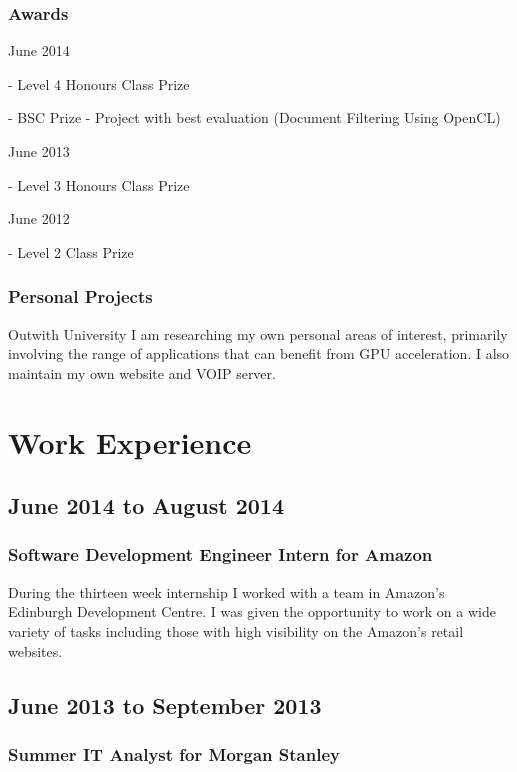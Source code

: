 \documentclass[11pt,a4paper]{article}
\begin{document}
\subsubsection*{Awards}

June 2014

- Level 4 Honours Class Prize

- BSC Prize - Project with best evaluation (Document Filtering Using OpenCL)

June 2013

- Level 3 Honours Class Prize

June 2012

- Level 2 Class Prize

\subsubsection*{Personal Projects}

Outwith University I am researching my own personal areas of interest, primarily
involving the range of applications that can benefit from GPU acceleration. I
also maintain my own website and VOIP server.

\section*{Work Experience}

\subsection*{June 2014 to August 2014}

\subsubsection*{Software Development Engineer Intern for Amazon}

During the thirteen week internship I worked with a team in Amazon's Edinburgh
Development Centre. I was given the opportunity to work on a wide variety of
tasks including those with high visibility on the Amazon's retail websites.

\subsection*{June 2013 to September 2013}

\subsubsection*{Summer IT Analyst for Morgan Stanley}
\end{document}
